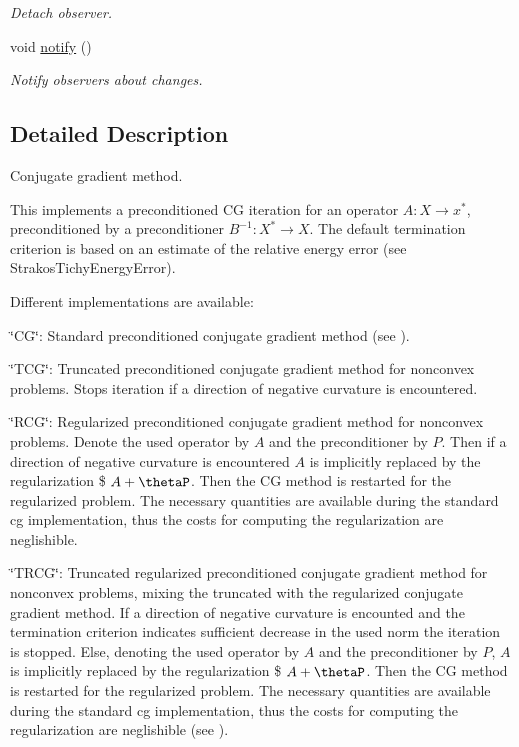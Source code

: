 \begin{DoxyCompactItemize}
\begin{DoxyCompactList}\small\item\em Detach observer. \end{DoxyCompactList}\item 
\hypertarget{classSpacy_1_1Mixin_1_1MixinConnection_a1ddeaa78a3bb4a38c2cca36d1f99fe36}{}void \hyperlink{classSpacy_1_1Mixin_1_1MixinConnection_a1ddeaa78a3bb4a38c2cca36d1f99fe36}{notify} ()\label{classSpacy_1_1Mixin_1_1MixinConnection_a1ddeaa78a3bb4a38c2cca36d1f99fe36}

\begin{DoxyCompactList}\small\item\em Notify observers about changes. \end{DoxyCompactList}\end{DoxyCompactItemize}


\subsection{Detailed Description}
Conjugate gradient method. 

This implements a preconditioned C\+G iteration for an operator $ A: X\to x^* $, preconditioned by a preconditioner $ B^{-1}: X^* \to X $. The default termination criterion is based on an estimate of the relative energy error (see Strakos\+Tichy\+Energy\+Error).

Different implementations are available\+:


\begin{DoxyItemize}
\item \char`\"{}\+C\+G\char`\"{}\+: Standard preconditioned conjugate gradient method (see \cite{Hestenes1952}).
\item \char`\"{}\+T\+C\+G\char`\"{}\+: Truncated preconditioned conjugate gradient method for nonconvex problems. Stops iteration if a direction of negative curvature is encountered.
\item \char`\"{}\+R\+C\+G\char`\"{}\+: Regularized preconditioned conjugate gradient method for nonconvex problems. Denote the used operator by $A$ and the preconditioner by $P$. Then if a direction of negative curvature is encountered $A$ is implicitly replaced by the regularization \$ $A+\thetaP$. Then the C\+G method is restarted for the regularized problem. The necessary quantities are available during the standard cg implementation, thus the costs for computing the regularization are neglishible.
\item \char`\"{}\+T\+R\+C\+G\char`\"{}\+: Truncated regularized preconditioned conjugate gradient method for nonconvex problems, mixing the truncated with the regularized conjugate gradient method. If a direction of negative curvature is encounted and the termination criterion indicates sufficient decrease in the used norm the iteration is stopped. Else, denoting the used operator by $A$ and the preconditioner by $P$, $A$ is implicitly replaced by the regularization \$ $A+\thetaP$. Then the C\+G method is restarted for the regularized problem. The necessary quantities are available during the standard cg implementation, thus the costs for computing the regularization are neglishible (see \cite{Lubkoll2015a}). 
\end{DoxyItemize}

